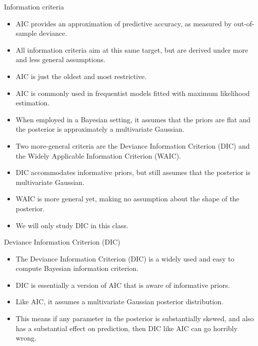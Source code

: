 \documentclass[handout]{beamer}
\begin{document}
\begin{frame}{Information criteria}
\scriptsize{

\begin{itemize}
\item AIC provides an approximation of predictive accuracy, as measured by out-of-sample deviance. 

\item All information criteria aim at this same target, but are derived under more and less general assumptions.

\item AIC is just the oldest and most restrictive.
\item AIC is commonly used in frequentist models fitted with maximum likelihood estimation.

\item When employed in a Bayesian setting, it assumes that the priors are flat and the posterior is approximately a multivariate Gaussian.

\item Two more-general criteria are the  Deviance Information Criterion (DIC) and the Widely Applicable Information Criterion (WAIC). 

\item DIC accommodates informative priors, but still assumes that the posterior is multivariate
Gaussian. 
\item WAIC is more general yet, making no assumption about the shape of the posterior.
\item We will only study DIC in this class.

\end{itemize}


} 
\end{frame}


\begin{frame}{Deviance Information Criterion (DIC)}
\scriptsize{

\begin{itemize}

\item The Deviance Information Criterion (DIC) is a widely used and easy to compute Bayesian information criterion. 
\item  DIC is essentially a version of AIC that is aware of informative priors.
\item Like AIC, it assumes a multivariate Gaussian posterior distribution. 
\item This means if any parameter in the posterior is substantially skewed, and also has a substantial effect on prediction, then DIC like AIC can go horribly wrong.

\end{itemize}


} 
\end{frame}
\end{document}
